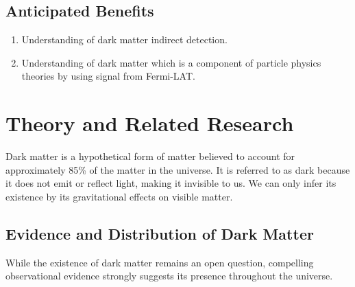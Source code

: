 \documentclass[10pt, oneside]{book}
\numberwithin{equation}{chapter}
\begin{document}
\section{Anticipated Benefits}
\begin{enumerate}
	\item Understanding of dark matter indirect detection.
	\item Understanding of dark matter which is a component of particle physics theories by using signal from Fermi-LAT.
\end{enumerate}

\chapter{Theory and Related Research}

Dark matter is a hypothetical form of matter believed to account for approximately 85\% of the matter in the universe. It is referred to as dark because it does not emit or reflect light, making it invisible to us. We can only infer its existence by its gravitational effects on visible matter.

\section{Evidence and Distribution of Dark Matter}
While the existence of dark matter remains an open question, compelling observational evidence strongly suggests its presence throughout the universe.
\end{document}
